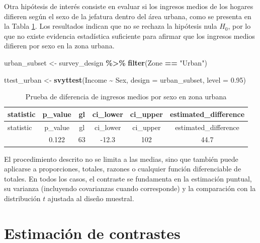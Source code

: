 \documentclass[
  spanish,
  12pt,
]{book}
\newenvironment{Shaded}{\begin{snugshade}}{\end{snugshade}}
\newcommand{\AttributeTok}[1]{\textcolor[rgb]{0.13,0.29,0.53}{#1}}
\newcommand{\FloatTok}[1]{\textcolor[rgb]{0.00,0.00,0.81}{#1}}
\newcommand{\FunctionTok}[1]{\textcolor[rgb]{0.13,0.29,0.53}{\textbf{#1}}}
\newcommand{\NormalTok}[1]{#1}
\newcommand{\OtherTok}[1]{\textcolor[rgb]{0.56,0.35,0.01}{#1}}
\newcommand{\SpecialCharTok}[1]{\textcolor[rgb]{0.81,0.36,0.00}{\textbf{#1}}}
\newcommand{\StringTok}[1]{\textcolor[rgb]{0.31,0.60,0.02}{#1}}
\begin{document}
Otra hipótesis de interés consiste en evaluar si los ingresos medios de los hogares difieren según el sexo de la jefatura dentro del área urbana, como se presenta en la Tabla \ref{tab:tab-ttest-sexo-urbano}. Los resultados indican que no se rechaza la hipótesis nula \(H_0\), por lo que no existe evidencia estadística suficiente para afirmar que los ingresos medios difieren por sexo en la zona urbana.

\begin{Shaded}
\begin{Highlighting}[]
\NormalTok{urban\_subset }\OtherTok{\textless{}{-}}\NormalTok{ survey\_design }\SpecialCharTok{\%\textgreater{}\%}
  \FunctionTok{filter}\NormalTok{(Zone }\SpecialCharTok{==} \StringTok{"Urban"}\NormalTok{)}

\NormalTok{ttest\_urban }\OtherTok{\textless{}{-}} \FunctionTok{svyttest}\NormalTok{(Income }\SpecialCharTok{\textasciitilde{}}\NormalTok{ Sex, }\AttributeTok{design =}\NormalTok{ urban\_subset, }\AttributeTok{level =} \FloatTok{0.95}\NormalTok{)}
\end{Highlighting}
\end{Shaded}

\begin{longtable}[]{@{}lccccc@{}}
\caption{\label{tab:tab-ttest-sexo-urbano}Prueba de diferencia de ingresos medios por sexo en zona urbana}\tabularnewline
\toprule\noalign{}
statistic & p\_value & gl & ci\_lower & ci\_upper & estimated\_difference \\
\midrule\noalign{}
\endfirsthead
\toprule\noalign{}
statistic & p\_value & gl & ci\_lower & ci\_upper & estimated\_difference \\
\midrule\noalign{}
\endhead
\bottomrule\noalign{}
\endlastfoot
1.57 & 0.122 & 63 & -12.3 & 102 & 44.7 \\
\end{longtable}

El procedimiento descrito no se limita a las medias, sino que también puede aplicarse a proporciones, totales, razones o cualquier función diferenciable de totales. En todos los casos, el contraste se fundamenta en la estimación puntual, su varianza (incluyendo covarianzas cuando corresponde) y la comparación con la distribución \(t\) ajustada al diseño muestral.

\section{Estimación de contrastes}\label{estimacion-de-contrastes}
\end{document}
